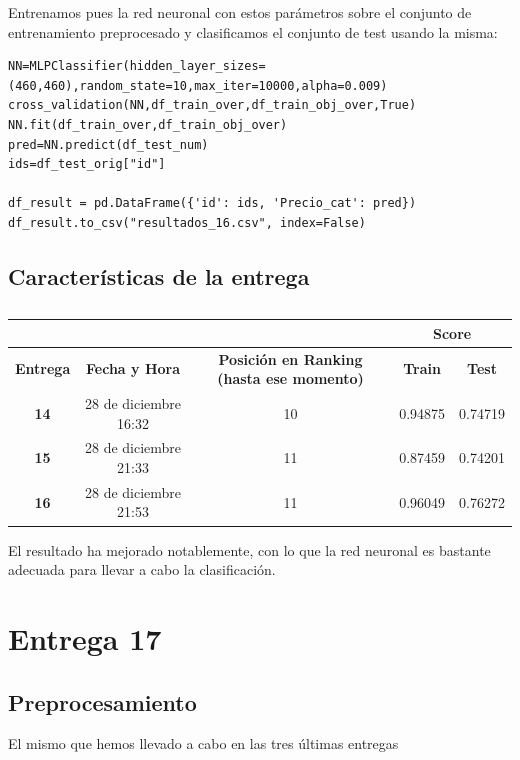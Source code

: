 \documentclass[a4paper,11pt]{article}
\begin{document}
 Entrenamos pues la red neuronal con estos parámetros sobre el conjunto de entrenamiento preprocesado y clasificamos el conjunto de test usando la misma:
 
 \begin{verbatim}
NN=MLPClassifier(hidden_layer_sizes=(460,460),random_state=10,max_iter=10000,alpha=0.009)
cross_validation(NN,df_train_over,df_train_obj_over,True)
NN.fit(df_train_over,df_train_obj_over)
pred=NN.predict(df_test_num)
ids=df_test_orig["id"]

df_result = pd.DataFrame({'id': ids, 'Precio_cat': pred})
df_result.to_csv("resultados_16.csv", index=False)
 \end{verbatim}
 
 \subsection{Características de la entrega}
 \begin{table}[htbp]
 	\caption{}\begin{center}
 	\begin{tabular}{|c|c|c|c|c|}
 		\hline
 		\multicolumn{1}{|l|}{\textbf{}} & \textbf{} & \textbf{} & \multicolumn{ 2}{c|}{\textbf{Score}} \\ \hline
 		\textbf{Entrega} & \textbf{Fecha y Hora} & \textbf{Posición en Ranking (hasta ese momento)} & \textbf{Train} & \textbf{Test} \\ \hline
 		\textbf{14} & 28 de diciembre 16:32  & 10 & 0.94875 & 0.74719 \\ \hline
 		\textbf{15} & 28 de diciembre 21:33  & 11 & 0.87459 & 0.74201 \\ \hline
 		\textbf{16} & 28 de diciembre 21:53 & 11 & 0.96049 & 0.76272 \\ \hline
 	\end{tabular}\end{center}
 	\label{}
 \end{table}
 
 El resultado ha mejorado notablemente, con lo que la red neuronal es bastante adecuada para llevar a cabo la clasificación. 
 
 \section{Entrega 17}
 \subsection{Preprocesamiento}
 El mismo que hemos llevado a cabo en las tres últimas entregas
\end{document}
